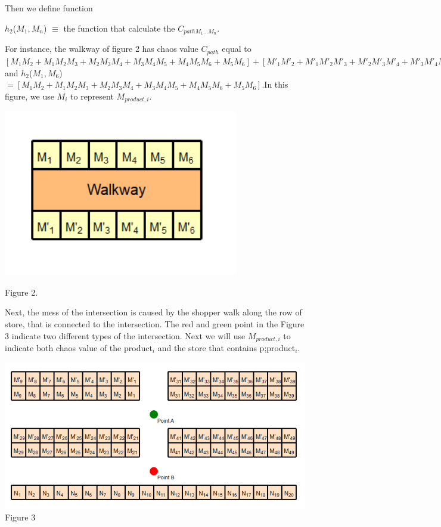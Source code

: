Then we define function 
\begin{definition}
$h_2$($M_1,M_n$) $\equiv$ the function that calculate the $C_{pathM_1...M_n}$.
\end{definition}
For instance, the walkway of figure 2 has chaos value $C_{path}$ equal to $[M_1M_2+M_1M_2M_3+M_2M_3M_4+M_3M_4M_5+M_4M_5M_6+M_5M_6]+[M'_1M'_2+M'_1M'_2M'_3+M'_2M'_3M'_4+M'_3M'_4M'_5+M'_4M'_5M'_6+M'_5M'_6]$ and $h_2$($M_1,M_6$)$=[M_1M_2+M_1M_2M_3+M_2M_3M_4+M_3M_4M_5+M_4M_5M_6+M_5M_6]$.In this figure, we use $M_i$ to represent $M_{product,i}$.
\begin{center}
\includegraphics[]{fig1.PNG}

Figure 2.
\end{center}

Next, the mess of the intersection is caused by the shopper walk along the row of store, that is connected to the intersection. The red and green point in the Figure 3 indicate two different types of the intersection. Next we will use $M_{product,i}$ to indicate both chaos value of the product$_i$ and the store that contains p;product$_i$. 

\begin{center}
\includegraphics[width=\textwidth]{fig2.PNG}
Figure 3
\end{center}

